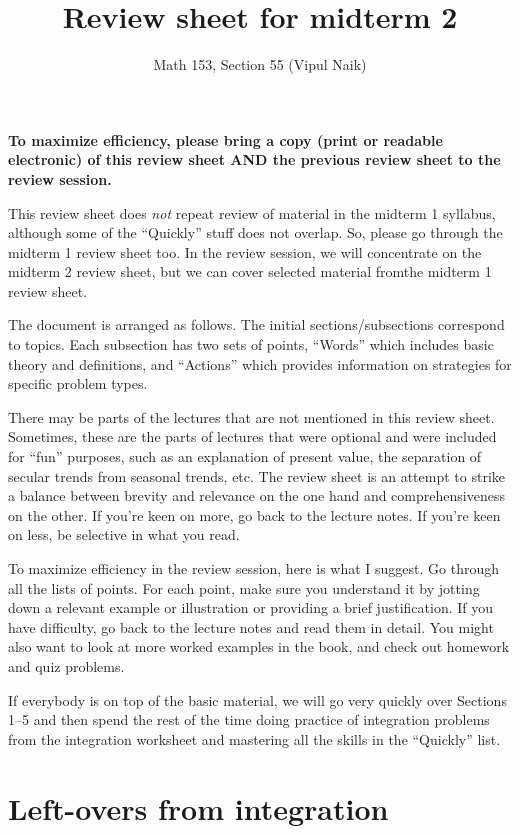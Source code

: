 \documentclass[10pt]{amsart}
\title{Review sheet for midterm 2}
\author{Math 153, Section 55 (Vipul Naik)}
\begin{document}
\maketitle

{\bf To maximize efficiency, please bring a copy (print or readable
electronic) of this review sheet AND the previous review sheet to the
review session.}

This review sheet does {\em not} repeat review of material in the
midterm 1 syllabus, although some of the ``Quickly'' stuff does not
overlap. So, please go through the midterm 1 review sheet too. In the
review session, we will concentrate on the midterm 2 review sheet, but
we can cover selected material fromthe midterm 1 review sheet.

The document is arranged as follows. The initial sections/subsections
correspond to topics. Each subsection has two sets of points,
``Words'' which includes basic theory and definitions, and ``Actions''
which provides information on strategies for specific problem
types.

There may be parts of the lectures that are not mentioned in this
review sheet. Sometimes, these are the parts of lectures that were
optional and were included for ``fun'' purposes, such as an
explanation of present value, the separation of secular trends from
seasonal trends, etc. The review sheet is an attempt to strike a
balance between brevity and relevance on the one hand and
comprehensiveness on the other. If you're keen on more, go back to the
lecture notes. If you're keen on less, be selective in what you read.

To maximize efficiency in the review session, here is what I
suggest. Go through all the lists of points. For each point, make sure
you understand it by jotting down a relevant example or illustration
or providing a brief justification. If you have difficulty, go back to
the lecture notes and read them in detail. You might also want to look
at more worked examples in the book, and check out homework and quiz
problems.

If everybody is on top of the basic material, we will go very quickly
over Sections 1--5 and then spend the rest of the time doing practice
of integration problems from the integration worksheet and mastering
all the skills in the ``Quickly'' list.

\section{Left-overs from integration}
\end{document}
